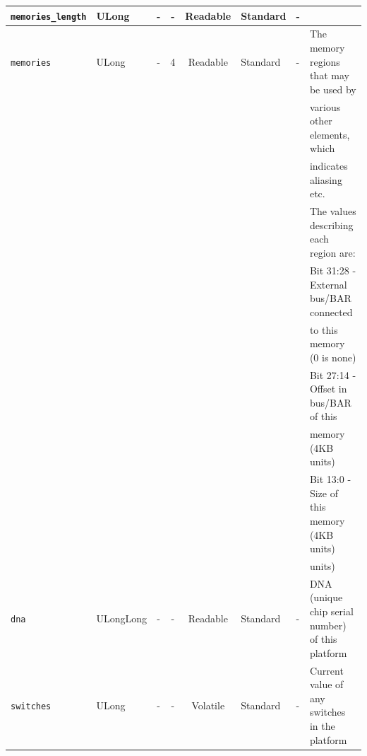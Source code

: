 \documentclass{article}
\begin{document}
\begin{landscape}
\begin{scriptsize}
\begin{tabular}{|p{3cm}|p{1.5cm}|c|c|c|p{1.5cm}|p{1cm}|p{6cm}|}
			\hline
			\verb+memories_length+ & ULong & -           & -               & Readable           & Standard    & -       &                                                                               \\
			\hline
			\verb+memories+    & ULong  & -              & 4               & Readable           & Standard    & -       & The memory regions that may be used by \\
  	                     &        &                &                 &                    &             &         & various other elements, which          \\
  	                     &        &                &                 &                    &             &         & indicates aliasing etc.               \\
                         &        &                &                 &                    &             &         & The values describing each region are: \\
                         &        &                &                 &                    &             &         & Bit 31:28 - External bus/BAR connected \\
                         &        &                &                 &                    &             &         &             to this memory (0 is none) \\
                         &        &                &                 &                    &             &         & Bit 27:14 - Offset in bus/BAR of this  \\
                         &        &                &                 &                    &             &         &             memory (4KB units)         \\
                         &        &                &                 &                    &             &         & Bit  13:0 - Size of this memory (4KB units) \\
                         &        &                &                 &                    &             &         &             units) \\
			\hline
			\verb+dna+         & ULongLong & -           & -               & Readable           & Standard    & -       & DNA (unique chip serial number) of this platform \\
			\hline
			\verb+switches+    & ULong  & -              & -               & Volatile           & Standard    & -       & Current value of any switches in the platform                                 \\

\end{tabular}
\end{scriptsize}
\end{landscape}
\end{document}
